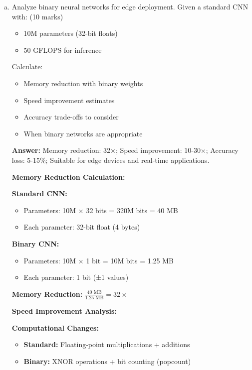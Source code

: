 \documentclass[12pt]{article}
\newcommand{\answer}[1]{{\color{answercolor}\textbf{Answer:} #1}}
\newcommand{\explanation}[1]{{\color{explanationcolor}#1}}
\begin{document}
\begin{enumerate}[(a)]
    \item Analyze binary neural networks for edge deployment. Given a standard CNN with: \hfill (10 marks)
    \begin{itemize}
        \item 10M parameters (32-bit floats)
        \item 50 GFLOPS for inference
    \end{itemize}
    
    Calculate:
    \begin{itemize}
        \item Memory reduction with binary weights
        \item Speed improvement estimates
        \item Accuracy trade-offs to consider
        \item When binary networks are appropriate
    \end{itemize}
    
    \answer{Memory reduction: 32×; Speed improvement: 10-30×; Accuracy loss: 5-15\%; Suitable for edge devices and real-time applications.}
    
    \explanation{
    \textbf{Memory Reduction Calculation:}
    
    \textbf{Standard CNN:}
    \begin{itemize}
        \item Parameters: 10M × 32 bits = 320M bits = 40 MB
        \item Each parameter: 32-bit float (4 bytes)
    \end{itemize}
    
    \textbf{Binary CNN:}
    \begin{itemize}
        \item Parameters: 10M × 1 bit = 10M bits = 1.25 MB
        \item Each parameter: 1 bit (±1 values)
    \end{itemize}
    
    \textbf{Memory Reduction:} $\frac{40 \text{ MB}}{1.25 \text{ MB}} = 32×$
    
    \textbf{Speed Improvement Analysis:}
    
    \textbf{Computational Changes:}
    \begin{itemize}
        \item \textbf{Standard:} Floating-point multiplications + additions
        \item \textbf{Binary:} XNOR operations + bit counting (popcount)
    \end{itemize}
    
}
\end{enumerate}
\end{document}
